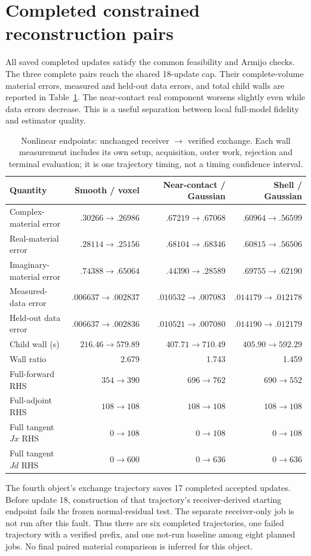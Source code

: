 \section{Completed constrained reconstruction pairs}
All saved completed updates satisfy the common feasibility and Armijo checks. The three complete pairs reach the shared 18-update cap. Their complete-volume material errors, measured and held-out data errors, and total child walls are reported in Table~\ref{tab:supp-nonlinear}. The near-contact real component worsens slightly even while data errors decrease. This is a useful separation between local full-model fidelity and estimator quality.

\begin{table}[htbp]\centering\small
\caption{Nonlinear endpoints: unchanged receiver $\to$ verified exchange. Each wall measurement includes its own setup, acquisition, outer work, rejection and terminal evaluation; it is one trajectory timing, not a timing confidence interval.}\label{tab:supp-nonlinear}
\begin{tabular}{lrrr}\toprule
Quantity&Smooth / voxel&Near-contact / Gaussian&Shell / Gaussian\\\midrule
Complex-material error&$.30266\to.26986$&$.67219\to.67068$&$.60964\to.56599$\\
Real-material error&$.28114\to.25156$&$.68104\to.68346$&$.60815\to.56506$\\
Imaginary-material error&$.74388\to.65064$&$.44390\to.28589$&$.69755\to.62190$\\
Measured-data error&$.006637\to.002837$&$.010532\to.007083$&$.014179\to.012178$\\
Held-out data error&$.006637\to.002836$&$.010521\to.007080$&$.014190\to.012179$\\
Child wall (s)&$216.46\to579.89$&$407.71\to710.49$&$405.90\to592.29$\\
Wall ratio&2.679&1.743&1.459\\
Full-forward RHS&$354\to390$&$696\to762$&$690\to552$\\
Full-adjoint RHS&$108\to108$&$108\to108$&$108\to108$\\
Full tangent $Jx$ RHS&$0\to108$&$0\to108$&$0\to108$\\
Full tangent $Jd$ RHS&$0\to600$&$0\to636$&$0\to636$\\\bottomrule
\end{tabular}
\end{table}

The fourth object's exchange trajectory saves 17 completed accepted updates. Before update 18, construction of that trajectory's receiver-derived starting endpoint fails the frozen normal-residual test. The separate receiver-only job is not run after this fault. Thus there are six completed trajectories, one failed trajectory with a verified prefix, and one not-run baseline among eight planned jobs. No final paired material comparison is inferred for this object.

